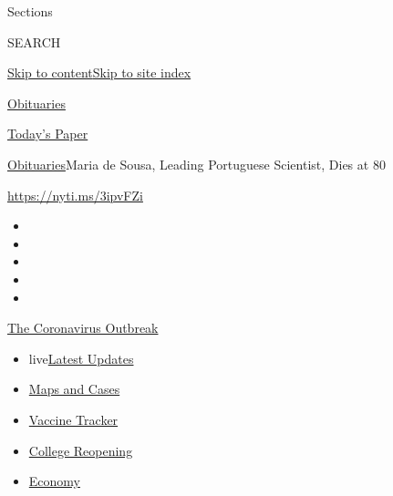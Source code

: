 Sections

SEARCH

\protect\hyperlink{site-content}{Skip to
content}\protect\hyperlink{site-index}{Skip to site index}

\href{https://www.nytimes.com/section/obituaries}{Obituaries}

\href{https://myaccount.nytimes.com/auth/login?response_type=cookie\&client_id=vi}{}

\href{https://www.nytimes.com/section/todayspaper}{Today's Paper}

\href{/section/obituaries}{Obituaries}\textbar{}Maria de Sousa, Leading
Portuguese Scientist, Dies at 80

\url{https://nyti.ms/3ipvFZi}

\begin{itemize}
\item
\item
\item
\item
\item
\end{itemize}

\href{https://www.nytimes.com/news-event/coronavirus?action=click\&pgtype=Article\&state=default\&region=TOP_BANNER\&context=storylines_menu}{The
Coronavirus Outbreak}

\begin{itemize}
\tightlist
\item
  live\href{https://www.nytimes.com/2020/08/03/world/coronavirus-covid-19.html?action=click\&pgtype=Article\&state=default\&region=TOP_BANNER\&context=storylines_menu}{Latest
  Updates}
\item
  \href{https://www.nytimes.com/interactive/2020/us/coronavirus-us-cases.html?action=click\&pgtype=Article\&state=default\&region=TOP_BANNER\&context=storylines_menu}{Maps
  and Cases}
\item
  \href{https://www.nytimes.com/interactive/2020/science/coronavirus-vaccine-tracker.html?action=click\&pgtype=Article\&state=default\&region=TOP_BANNER\&context=storylines_menu}{Vaccine
  Tracker}
\item
  \href{https://www.nytimes.com/2020/08/02/us/covid-college-reopening.html?action=click\&pgtype=Article\&state=default\&region=TOP_BANNER\&context=storylines_menu}{College
  Reopening}
\item
  \href{https://www.nytimes.com/live/2020/08/03/business/stock-market-today-coronavirus?action=click\&pgtype=Article\&state=default\&region=TOP_BANNER\&context=storylines_menu}{Economy}
\end{itemize}


